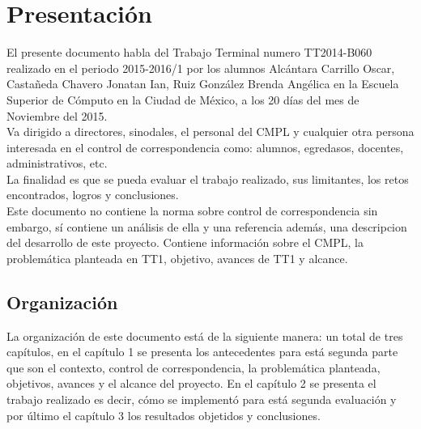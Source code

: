 \section{Presentación}

El presente documento habla del Trabajo Terminal numero TT2014-B060 realizado en el periodo 2015-2016/1 por los alumnos Alcántara Carrillo Oscar, Castañeda Chavero Jonatan Ian, Ruiz González Brenda Angélica en la Escuela Superior de Cómputo en la Ciudad de México, a los 20 días del mes de Noviembre del 2015.\\

Va dirigido a directores, sinodales, el personal del CMPL y cualquier otra persona interesada en el control de correspondencia como: alumnos, egredasos, docentes, administrativos, etc.\\
La finalidad es que se pueda evaluar el trabajo realizado, sus limitantes, los retos encontrados, logros y conclusiones.\\

Este documento no contiene la norma sobre control de correspondencia sin embargo, sí contiene un análisis de ella y una referencia además, una descripcion del desarrollo de este proyecto. Contiene información sobre el CMPL, la problemática planteada en TT1, objetivo, avances de TT1 y alcance. \\

\subsection{Organización}

La organización de este documento está de la siguiente manera: un total de tres capítulos, en el capítulo 1 se presenta los antecedentes para está segunda parte que son el contexto, control de correspondencia, la problemática planteada, objetivos, avances y el alcance del proyecto. En el capítulo 2 se presenta el trabajo realizado es decir, cómo se implementó para está segunda evaluación y por último el capítulo 3 los resultados objetidos y conclusiones. \\
